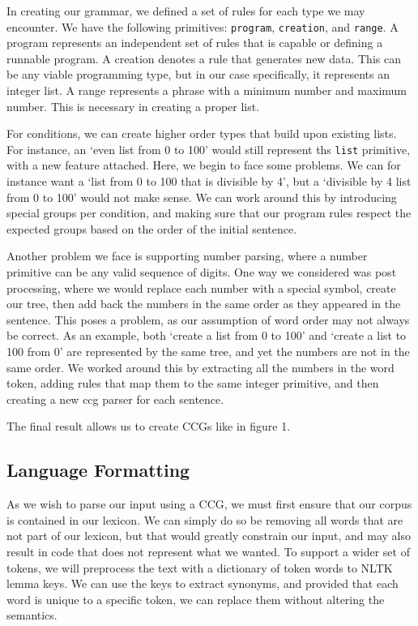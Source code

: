 \documentclass[11pt,letterpaper]{article}
\begin{document}
In creating our grammar, we defined a set of rules for each type we may encounter. 
We have the following primitives: {\small\verb|program|}, {\small\verb|creation|}, and {\small\verb|range|}.
A program represents an independent set of rules that is capable or defining a runnable program.
A creation denotes a rule that generates new data. 
This can be any viable programming type, but in our case specifically, it represents an integer list.
A range represents a phrase with a minimum number and maximum number.
This is necessary in creating a proper list.

For conditions, we can create higher order types that build upon existing lists.
For instance, an `even list from 0 to 100' would still represent ths {\small\verb|list|} primitive, with a new feature attached.
Here, we begin to face some problems.
We can for instance want a `list from 0 to 100 that is divisible by 4', but a `divisible by 4 list from 0 to 100' would not make sense.
We can work around this by introducing special groups per condition, and making sure that our program rules respect the expected groups based on the order of the initial sentence.

Another problem we face is supporting number parsing, where a number primitive can be any valid sequence of digits. 
One way we considered was post processing, where we would replace each number with a special symbol, create our tree, then add back the numbers in the same order as they appeared in the sentence.
This poses a problem, as our assumption of word order may not always be correct. As an example, both `create a list from 0 to 100' and `create a list to 100 from 0' are represented by the same tree, and yet the numbers are not in the same order.
We worked around this by extracting all the numbers in the word token, adding rules that map them to the same integer primitive, and then creating a new ccg parser for each sentence.

The final result allows us to create CCGs like in figure 1.
\subsection{Language Formatting}

As we wish to parse our input using a CCG, we must first ensure that our corpus is contained in our lexicon.
We can simply do so be removing all words that are not part of our lexicon, but that would greatly constrain our input, and may also result in code that does not represent what we wanted.
To support a wider set of tokens, we will preprocess the text with a dictionary of token words to NLTK lemma keys.
We can use the keys to extract synonyms, and provided that each word is unique to a specific token, we can replace them without altering the semantics.
\end{document}
